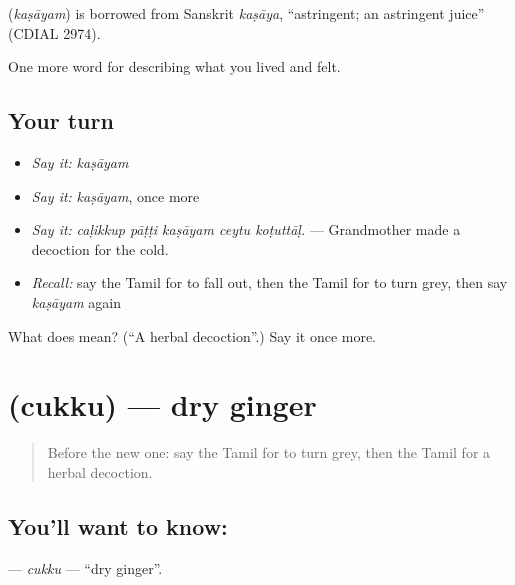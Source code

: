 \begin{cousinweb}
\textbf{} (\emph{kaṣāyam}) is borrowed from Sanskrit \emph{kaṣāya}, \textquotedblleft{}astringent; an astringent juice\textquotedblright{} (CDIAL 2974).
\end{cousinweb}

\begin{grammarlens}[title={What you've built}]
One more word for describing what you lived and felt.
\end{grammarlens}

\subsection*{Your turn}
\begin{itemize}
\raggedright
  \item \emph{Say it:} \emph{kaṣāyam}
  \item \emph{Say it:} \emph{kaṣāyam}, once more
  \item \emph{Say it:} \emph{caḷikkup pāṭṭi kaṣāyam ceytu koṭuttāḷ.} — Grandmother made a decoction for the cold.
  \item \emph{Recall:} say the Tamil for to fall out, then the Tamil for to turn grey, then say \emph{kaṣāyam} again
\end{itemize}

\begin{tcolorbox}[breakable,colback=teal!4,colframe=teal!35!black,title={Before you move on}]
What does  mean? (\textquotedblleft{}A herbal decoction\textquotedblright{}.) Say it once more.
\end{tcolorbox}
\section[\texorpdfstring{\ta{சுக்கு} (cukku)}{சுக்கு (cukku)}]{ (cukku) — dry ginger}

\label{lesson:TA-C485-cukku}



\begin{quote}
Before the new one: say the Tamil for to turn grey, then the Tamil for a herbal decoction.
\end{quote}

\subsection*{You'll want to know: }
\textbf{} — \emph{cukku} — \textquotedblleft{}dry ginger\textquotedblright{}.


